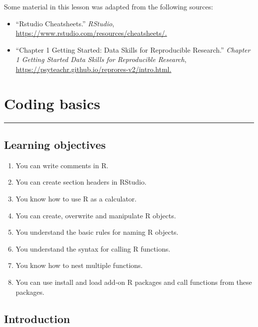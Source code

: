 \documentclass[
  letterpaper,
  DIV=11,
  numbers=noendperiod]{scrreprt}
\providecommand{\tightlist}{%
  \setlength{\itemsep}{0pt}\setlength{\parskip}{0pt}}\usepackage{longtable,booktabs,array}
\begin{document}
Some material in this lesson was adapted from the following sources:

\begin{itemize}
\tightlist
\item
  ``Rstudio Cheatsheets.'' \emph{RStudio},
  \url{https://www.rstudio.com/resources/cheatsheets/.}
\item
  ``Chapter 1 Getting Started: Data Skills for Reproducible Research.''
  \emph{Chapter 1 Getting Started \textbar{} Data Skills for
  Reproducible Research},
  \url{https://psyteachr.github.io/reprores-v2/intro.html.}
\end{itemize}

\chapter{Coding basics}\label{coding-basics}

\begin{center}\rule{0.5\linewidth}{0.5pt}\end{center}

\section*{Learning objectives}\label{learning-objectives-1}


\begin{enumerate}
\def\labelenumi{\arabic{enumi}.}
\item
  You can write comments in R.
\item
  You can create section headers in RStudio.
\item
  You know how to use R as a calculator.
\item
  You can create, overwrite and manipulate R objects.
\item
  You understand the basic rules for naming R objects.
\item
  You understand the syntax for calling R functions.
\item
  You know how to nest multiple functions.
\item
  You can use install and load add-on R packages and call functions from
  these packages.
\end{enumerate}

\section{Introduction}\label{introduction-3}
\end{document}
